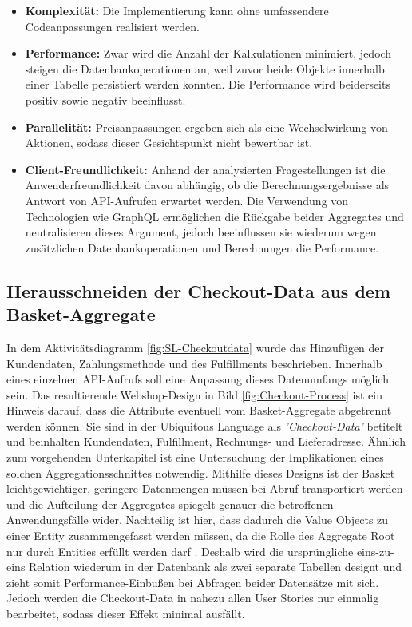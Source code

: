\begin{itemize}[topsep=-2pt]
	\item \textbf{Komplexität: } { Die Implementierung kann ohne umfassendere Codeanpassungen realisiert werden. }
	\item \textbf{Performance: } { Zwar wird die Anzahl der Kalkulationen minimiert, jedoch steigen die Datenbankoperationen an, weil zuvor beide Objekte innerhalb einer Tabelle persistiert werden konnten. Die Performance wird beiderseits positiv sowie negativ beeinflusst. }
	\item \textbf{Parallelität: } { Preisanpassungen ergeben sich als eine Wechselwirkung von Aktionen, sodass dieser Gesichtspunkt nicht bewertbar ist. }
	\item \textbf{Client-Freundlichkeit: } { Anhand der analysierten Fragestellungen ist die Anwenderfreundlichkeit davon abhängig, ob die Berechnungsergebnisse als Antwort von API-Aufrufen erwartet werden. Die Verwendung von Technologien wie GraphQL ermöglichen die Rückgabe beider Aggregates und neutralisieren dieses Argument, jedoch beeinflussen sie wiederum wegen zusätzlichen Datenbankoperationen und Berechnungen die Performance. }
\end{itemize}



\subsection{Herausschneiden der Checkout-Data aus dem Basket-Aggregate}

In dem Aktivitätsdiagramm \ref{fig:SL-Checkoutdata} wurde das Hinzufügen der Kundendaten, Zahlungsmethode und des Fulfillments beschrieben. Innerhalb eines einzelnen API-Aufrufs soll eine Anpassung dieses Datenumfangs möglich sein. Das resultierende Webshop-Design in Bild \ref{fig:Checkout-Process} ist ein Hinweis darauf, dass die Attribute eventuell vom Basket-Aggregate abgetrennt werden können. Sie sind in der Ubiquitous Language als \emph{'Checkout-Data'} betitelt und beinhalten Kundendaten, Fulfillment, Rechnungs- und Lieferadresse. Ähnlich zum vorgehenden Unterkapitel ist eine Untersuchung der Implikationen eines solchen Aggregationsschnittes notwendig. Mithilfe dieses Designs ist der Basket leichtgewichtiger, geringere Datenmengen müssen bei Abruf transportiert werden und die Aufteilung der Aggregates spiegelt genauer die betroffenen Anwendungsfälle wider. Nachteilig ist hier, dass dadurch die Value Objects zu einer Entity zusammengefasst werden müssen, da die Rolle des Aggregate Root nur durch Entities erfüllt werden darf \cite[S. 129]{Evans.2011}. Deshalb wird die ursprüngliche eins-zu-eins Relation wiederum in der Datenbank als zwei separate Tabellen designt und zieht somit Performance-Einbußen bei Abfragen beider Datensätze mit sich. Jedoch werden die Checkout-Data in nahezu allen User Stories nur einmalig bearbeitet, sodass dieser Effekt minimal ausfällt. 

